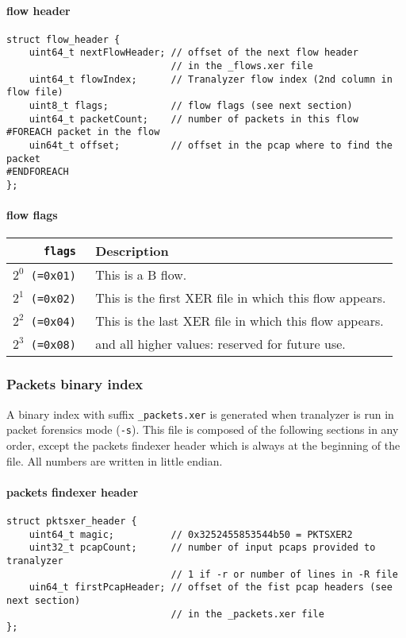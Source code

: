 \documentclass[documentation]{subfiles}
\begin{document}
\paragraph{flow header}
\begin{verbatim}
struct flow_header {
    uint64_t nextFlowHeader; // offset of the next flow header
                             // in the _flows.xer file
    uint64_t flowIndex;      // Tranalyzer flow index (2nd column in flow file)
    uint8_t flags;           // flow flags (see next section)
    uint64_t packetCount;    // number of packets in this flow
#FOREACH packet in the flow
    uin64t_t offset;         // offset in the pcap where to find the packet
#ENDFOREACH
};
\end{verbatim}

\paragraph{flow flags}

\begin{longtable}{>{\tt}rl}
    \toprule
    {\bf flags} & {\bf Description} \\
    \midrule\endhead%
    $2^{0}$ (=0x01) & This is a B flow.\\
    $2^{1}$ (=0x02) & This is the first XER file in which this flow appears.\\
    $2^{2}$ (=0x04) & This is the last XER file in which this flow appears.\\
    $2^{3}$ (=0x08) & and all higher values: reserved for future use.\\
    \bottomrule
\end{longtable}

\subsubsection{Packets binary index}

A binary index with suffix {\tt \_packets.xer} is generated when tranalyzer is run in packet forensics mode ({\tt -s}).
This file is composed of the following sections in any order, except the packets findexer header which is always at the beginning of the file.
All numbers are written in little endian.

\paragraph{packets findexer header}
\begin{verbatim}
struct pktsxer_header {
    uint64_t magic;          // 0x3252455853544b50 = PKTSXER2
    uint32_t pcapCount;      // number of input pcaps provided to tranalyzer
                             // 1 if -r or number of lines in -R file
    uin64_t firstPcapHeader; // offset of the fist pcap headers (see next section)
                             // in the _packets.xer file
};
\end{verbatim}
\end{document}
